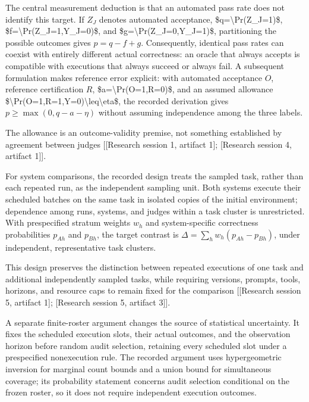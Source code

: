 \documentclass[11pt]{article}
\begin{document}
The central measurement deduction is that an automated pass rate does not identify this target. If $Z_J$ denotes automated acceptance, \$q=\textbackslash{}Pr(Z\_J=1)\$, \$f=\textbackslash{}Pr(Z\_J=1,Y\_J=0)\$, and \$g=\textbackslash{}Pr(Z\_J=0,Y\_J=1)\$, partitioning the possible outcomes gives $p=q-f+g$. Consequently, identical pass rates can coexist with entirely different actual correctness: an oracle that always accepts is compatible with executions that always succeed or always fail. A subsequent formulation makes reference error explicit: with automated acceptance $O$, reference certification $R$, \$a=\textbackslash{}Pr(O=1,R=0)\$, and an assumed allowance \$\textbackslash{}Pr(O=1,R=1,Y=0)\textbackslash{}leq\textbackslash{}eta\$, the recorded derivation gives $p\geq\max(0,q-a-\eta)$ without assuming independence among the three labels.

The allowance is an outcome-validity premise, not something established by agreement between judges [[Research session 1, artifact 1]; [Research session 4, artifact 1]].

For system comparisons, the recorded design treats the sampled task, rather than each repeated run, as the independent sampling unit. Both systems execute their scheduled batches on the same task in isolated copies of the initial environment; dependence among runs, systems, and judges within a task cluster is unrestricted. With prespecified stratum weights $w_h$ and system-specific correctness probabilities $p_{Ah}$ and $p_{Bh}$, the target contrast is $\Delta=\sum_h w_h(p_{Ah}-p_{Bh})$, under independent, representative task clusters.

This design preserves the distinction between repeated executions of one task and additional independently sampled tasks, while requiring versions, prompts, tools, horizons, and resource caps to remain fixed for the comparison [[Research session 5, artifact 1]; [Research session 5, artifact 3]].

A separate finite-roster argument changes the source of statistical uncertainty. It fixes the scheduled execution slots, their actual outcomes, and the observation horizon before random audit selection, retaining every scheduled slot under a prespecified nonexecution rule. The recorded argument uses hypergeometric inversion for marginal count bounds and a union bound for simultaneous coverage; its probability statement concerns audit selection conditional on the frozen roster, so it does not require independent execution outcomes.
\end{document}
